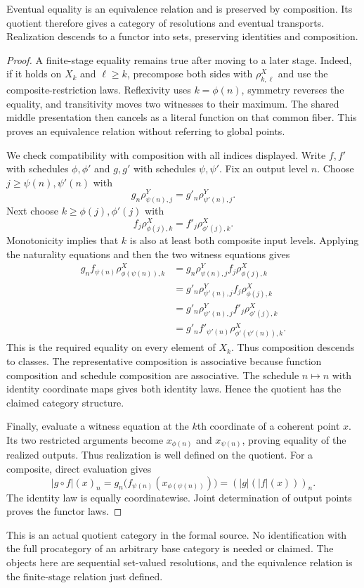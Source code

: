 \begin{KStheorem}\label{KS:KS61}
Eventual equality is an equivalence relation and is preserved by composition. Its quotient therefore gives a category of resolutions and eventual transports. Realization descends to a functor into sets, preserving identities and composition.
\end{KStheorem}
\begin{proof}
A finite-stage equality remains true after moving to a later stage. Indeed, if it holds on $X_k$ and $\ell\ge k$, precompose both sides with $\rho^X_{k,\ell}$ and use the composite-restriction laws. Reflexivity uses $k=\phi(n)$, symmetry reverses the equality, and transitivity moves two witnesses to their maximum. The shared middle presentation then cancels as a literal function on that common fiber. This proves an equivalence relation without referring to global points.

We check compatibility with composition with all indices displayed. Write $f,f'$ with schedules $\phi,\phi'$ and $g,g'$ with schedules $\psi,\psi'$. Fix an output level $n$. Choose $j\ge\psi(n),\psi'(n)$ with
\[
 g_n\rho^Y_{\psi(n),j}=g'_n\rho^Y_{\psi'(n),j}.
\]
Next choose $k\ge\phi(j),\phi'(j)$ with
\[
 f_j\rho^X_{\phi(j),k}=f'_j\rho^X_{\phi'(j),k}.
\]
Monotonicity implies that $k$ is also at least both composite input levels. Applying the naturality equations and then the two witness equations gives
\[
\begin{aligned}
 g_nf_{\psi(n)}\rho^X_{\phi(\psi(n)),k}
 &=g_n\rho^Y_{\psi(n),j}f_j\rho^X_{\phi(j),k}\\
 &=g'_n\rho^Y_{\psi'(n),j}f_j\rho^X_{\phi(j),k}\\
 &=g'_n\rho^Y_{\psi'(n),j}f'_j\rho^X_{\phi'(j),k}\\
 &=g'_nf'_{\psi'(n)}\rho^X_{\phi'(\psi'(n)),k}.
\end{aligned}
\]
This is the required equality on every element of $X_k$. Thus composition descends to classes. The representative composition is associative because function composition and schedule composition are associative. The schedule $n\mapsto n$ with identity coordinate maps gives both identity laws. Hence the quotient has the claimed category structure.

Finally, evaluate a witness equation at the $k$th coordinate of a coherent point $x$. Its two restricted arguments become $x_{\phi(n)}$ and $x_{\psi(n)}$, proving equality of the realized outputs. Thus realization is well defined on the quotient. For a composite, direct evaluation gives
\[
 |g\circ f|(x)_n=g_n\bigl(f_{\psi(n)}(x_{\phi(\psi(n))})\bigr)
 =(|g|(|f|(x)))_n.
\]
The identity law is equally coordinatewise. Joint determination of output points proves the functor laws.
\end{proof}
This is an actual quotient category in the formal source. No identification with the full procategory of an arbitrary base category is needed or claimed. The objects here are sequential set-valued resolutions, and the equivalence relation is the finite-stage relation just defined.

